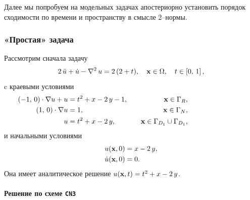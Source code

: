 Далее мы попробуем на модельных задачах апостериорно установить порядок сходимости по времени и пространству в смысле 2--нормы.

\subsubsection{«Простая» задача}
\label{simple}

Рассмотрим сначала задачу
\begin{equation}
	2 \, \ddot{u} + \dot{u} -  \nabla^2 \, u = 2 \, (2 + t), \quad \boldsymbol{\mathbf{x}} \in \Omega, \quad t \in \left[ 0, \, 1 \right],
\end{equation}
c краевыми условиями
\begin{align*}
	(-1, \, 0) \cdot \nabla u + u &= t^2 + x - 2 \, y - 1, \quad & \boldsymbol{\mathbf{x}} \in \Gamma_R, & \qquad \qquad \qquad \qquad \\
	(1, \, 0) \cdot \nabla u &= 1, & \boldsymbol{\mathbf{x}} \in \Gamma_N, & \\
	u &= t^2 + x - 2 \, y, & \boldsymbol{\mathbf{x}} \in \Gamma_{D_1} \cup \Gamma_{D_1}, &
\end{align*}
и начальными условиями
\begin{align*}
	u(\boldsymbol{\mathbf{x}}, 0) &= x - 2 \, y, \\
	\dot{u}(\boldsymbol{\mathbf{x}}, 0) &= 0.
\end{align*}
Она имеет аналитическое решение $u(\boldsymbol{\mathbf{x}}, t) = t^2 + x - 2 \, y$.

\paragraph{Решение по схеме \texttt{CN3}}

